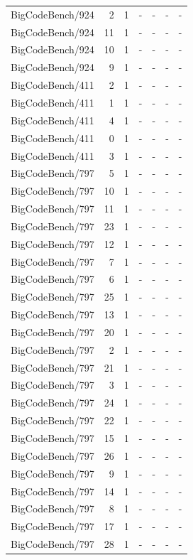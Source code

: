 \begin{longtable}{lrrllll}
BigCodeBench/924 & 2 & 1 & - & - & - & - \\
BigCodeBench/924 & 11 & 1 & - & - & - & - \\
BigCodeBench/924 & 10 & 1 & - & - & - & - \\
BigCodeBench/924 & 9 & 1 & - & - & - & - \\
BigCodeBench/411 & 2 & 1 & - & - & - & - \\
BigCodeBench/411 & 1 & 1 & - & - & - & - \\
BigCodeBench/411 & 4 & 1 & - & - & - & - \\
BigCodeBench/411 & 0 & 1 & - & - & - & - \\
BigCodeBench/411 & 3 & 1 & - & - & - & - \\
BigCodeBench/797 & 5 & 1 & - & - & - & - \\
BigCodeBench/797 & 10 & 1 & - & - & - & - \\
BigCodeBench/797 & 11 & 1 & - & - & - & - \\
BigCodeBench/797 & 23 & 1 & - & - & - & - \\
BigCodeBench/797 & 12 & 1 & - & - & - & - \\
BigCodeBench/797 & 7 & 1 & - & - & - & - \\
BigCodeBench/797 & 6 & 1 & - & - & - & - \\
BigCodeBench/797 & 25 & 1 & - & - & - & - \\
BigCodeBench/797 & 13 & 1 & - & - & - & - \\
BigCodeBench/797 & 20 & 1 & - & - & - & - \\
BigCodeBench/797 & 2 & 1 & - & - & - & - \\
BigCodeBench/797 & 21 & 1 & - & - & - & - \\
BigCodeBench/797 & 3 & 1 & - & - & - & - \\
BigCodeBench/797 & 24 & 1 & - & - & - & - \\
BigCodeBench/797 & 22 & 1 & - & - & - & - \\
BigCodeBench/797 & 15 & 1 & - & - & - & - \\
BigCodeBench/797 & 26 & 1 & - & - & - & - \\
BigCodeBench/797 & 9 & 1 & - & - & - & - \\
BigCodeBench/797 & 14 & 1 & - & - & - & - \\
BigCodeBench/797 & 8 & 1 & - & - & - & - \\
BigCodeBench/797 & 17 & 1 & - & - & - & - \\
BigCodeBench/797 & 28 & 1 & - & - & - & - \\

\end{longtable}
